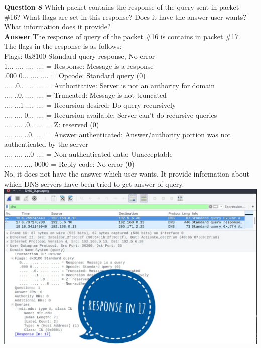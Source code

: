 \documentclass[14pt]{extarticle}
\begin{document}
    \noindent
    \textbf{\large Question 8}
    Which packet contains the response of the query sent in packet \#16? What flags are set in this response?
Does it have the answer user wants? What information does it provide?\\[10pt]
    \textbf{\large Answer}
    The response of query of the packet \#16 is contains in packet \#17.\\
    The flags in the response is as follows:\\
    Flags: 0x8100 Standard query response, No error\\
    1... .... .... .... = Response: Message is a response\\
    .000 0... .... .... = Opcode: Standard query (0)\\
    .... .0.. .... .... = Authoritative: Server is not an authority for domain\\
    .... ..0. .... .... = Truncated: Message is not truncated\\
    .... ...1 .... .... = Recursion desired: Do query recursively\\
    .... .... 0... .... = Recursion available: Server can't do recursive queries\\
    .... .... .0.. .... = Z: reserved (0)\\
    .... .... ..0. .... = Answer authenticated: Answer/authority portion was not authenticated by the server\\
    .... .... ...0 .... = Non-authenticated data: Unacceptable\\
    .... .... .... 0000 = Reply code: No error (0)\\
    No, it does not have the answer which user wants. It provide information about which DNS servers have been tried to get answer of query.\\[10pt]
    \includegraphics[scale=0.45]{3_8_1}\\[10pt]
    \vspace{1cm}
\end{document}
